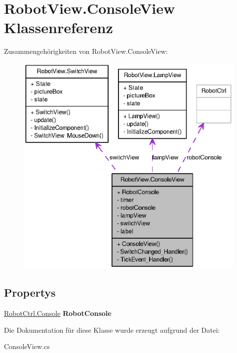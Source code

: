 \hypertarget{class_robot_view_1_1_console_view}{
\section{RobotView.ConsoleView Klassenreferenz}
\label{class_robot_view_1_1_console_view}
}


Zusammengehörigkeiten von RobotView.ConsoleView:\nopagebreak
\begin{figure}[H]
\begin{center}
\leavevmode
\includegraphics[width=384pt]{class_robot_view_1_1_console_view__coll__graph}
\end{center}
\end{figure}
\subsection*{Propertys}
\begin{DoxyCompactItemize}
\item 
\hypertarget{class_robot_view_1_1_console_view_a699a62faa0e0c66c3fedba5abd70313a}{
\hyperlink{class_robot_ctrl_1_1_console}{RobotCtrl.Console} {\bfseries RobotConsole}}
\label{class_robot_view_1_1_console_view_a699a62faa0e0c66c3fedba5abd70313a}

\end{DoxyCompactItemize}


Die Dokumentation für diese Klasse wurde erzeugt aufgrund der Datei:\begin{DoxyCompactItemize}
\item 
ConsoleView.cs\end{DoxyCompactItemize}
